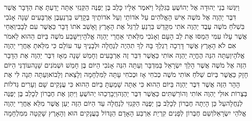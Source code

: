 \documentclass[../main/main.tex]{subfiles}
\begin{document}
\begin{multicols*}{\ncols}
וַיִּגְּשׁוּ בְנֵי יְהוּדָה אֶל יְהוֹשֻׁעַ בַּגִּלְגָּל וַיֹּאמֶר אֵלָיו כָּלֵב בֶּן יְפֻנֶּה הַקְּנִזִּי אַתָּה יָדַעְתָּ אֶת הַדָּבָר אֲשֶׁר דִּבֶּר יַהְוֶה אֶל מֹשֶׁה אִישׁ הָאֱלֹהִים עַל אֹדוֹתַי וְעַל אֹדוֹתֶיךָ בְּקָדֵשׁ בַּרְנֵעַ\PreVerseSpace{}בֶּן אַרְבָּעִים שָׁנָה אָנֹכִי בִּשְׁלֹחַ מֹשֶׁה עֶבֶד יַהְוֶה אֹתִי מִקָּדֵשׁ בַּרְנֵעַ לְרַגֵּל אֶת הָאָרֶץ וָאָשֵׁב אֹתוֹ דָּבָר כַּאֲשֶׁר עִם לְבָבִי\PreVerseSpace{}וְאַחַי אֲשֶׁר עָלוּ עִמִּי הֵמַסּוּ אֶת לֵב הָעָם וְאָנֹכִי מִלֵּאתִי אַחֲרֵי יַהְוֶה אֱלֹהָי\PreVerseSpace{}וַיִּשָּׁבַע מֹשֶׁה בַּיּוֹם הַהוּא לֵאמֹר אִם לֹא הָאָרֶץ אֲשֶׁר דָּרְכָה רַגְלְךָ בָּהּ לְךָ תִהְיֶה לְנַחֲלָה וּלְבָנֶיךָ עַד עוֹלָם כִּי מִלֵּאתָ אַחֲרֵי יַהְוֶה אֱלֹהָי\PreVerseSpace{}וְעַתָּה הִנֵּה הֶחֱיָה יַהְוֶה אוֹתִי כַּאֲשֶׁר דִּבֵּר זֶה אַרְבָּעִים וְחָמֵשׁ שָׁנָה מֵאָז דִּבֶּר יַהְוֶה אֶת הַדָּבָר הַזֶּה אֶל מֹשֶׁה אֲשֶׁר הָלַךְ יִשְׂרָאֵל בַּמִּדְבָּר וְעַתָּה הִנֵּה אָנֹכִי הַיּוֹם בֶּן חָמֵשׁ וּשְׁמֹנִים שָׁנָה\PreVerseSpace{}עוֹדֶנִּי הַיּוֹם חָזָק כַּאֲשֶׁר בְּיוֹם שְׁלֹחַ אוֹתִי מֹשֶׁה כְּכֹחִי אָז וּכְכֹחִי עָתָּה לַמִּלְחָמָה וְלָצֵאת וְלָבוֹא\PreVerseSpace{}וְעַתָּה תְּנָה לִּי אֶת הָהָר הַזֶּה אֲשֶׁר דִּבֶּר יַהְוֶה בַּיּוֹם הַהוּא כִּי אַתָּה שָׁמַעְתָּ בַיּוֹם הַהוּא כִּי עֲנָקִים שָׁם וְעָרִים גְּדֹלוֹת בְּצֻרוֹת אוּלַי יַהְוֶה אוֹתִי וְהוֹרַשְׁתִּים כַּאֲשֶׁר דִּבֶּר יַהְוֶה\PreVerseSpace{}וַיְבָרְכֵהוּ יְהוֹשֻׁעַ וַיִּתֵּן אֶת חֶבְרוֹן לְכָלֵב בֶּן יְפֻנֶּה לְנַחֲלָה\PreVerseSpace{}עַל כֵּן הָיְתָה חֶבְרוֹן לְכָלֵב בֶּן יְפֻנֶּה הַקְּנִזִּי לְנַחֲלָה עַד הַיּוֹם הַזֶּה יַעַן אֲשֶׁר מִלֵּא אַחֲרֵי יַהְוֶה אֱלֹהֵי יִשְׂרָאֵל\PreVerseSpace{}וְשֵׁם חֶבְרוֹן לְפָנִים קִרְיַת אַרְבַּע הָאָדָם הַגָּדוֹל בָּעֲנָקִים הוּא וְהָאָרֶץ שָׁקְטָה מִמִּלְחָמָה\OpenSection{}\par

\end{multicols*}
\end{document}
